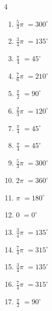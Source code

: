 \begin{multicols}{4}
\begin{enumerate}
  \item $\displaystyle \frac{5}{3}\pi$
        $\displaystyle =300^{\circ}$

  \item $\displaystyle \frac{3}{4}\pi$
        $\displaystyle =135^{\circ}$

  \item $\displaystyle \frac{\pi}{4}$
        $\displaystyle =45^{\circ}$

  \item $\displaystyle \frac{7}{6}\pi$
        $\displaystyle =210^{\circ}$

\columnbreak %

  \item $\displaystyle \frac{\pi}{2}$
        $\displaystyle =90^{\circ}$

  \item $\displaystyle \frac{2}{3}\pi$
        $\displaystyle =120^{\circ}$

  \item $\displaystyle \frac{\pi}{4}$
        $\displaystyle =45^{\circ}$

  \item $\displaystyle \frac{\pi}{4}$
        $\displaystyle =45^{\circ}$

  \item $\displaystyle \frac{5}{3}\pi$
        $\displaystyle =300^{\circ}$

  \item $\displaystyle 2\pi$
        $\displaystyle =360^{\circ}$

  \item $\displaystyle \pi$
        $\displaystyle =180^{\circ}$

  \item $\displaystyle 0$
        $\displaystyle =0^{\circ}$

  \item $\displaystyle \frac{3}{4}\pi$
        $\displaystyle =135^{\circ}$

  \item $\displaystyle \frac{7}{4}\pi$
        $\displaystyle =315^{\circ}$

  \item $\displaystyle \frac{3}{4}\pi$
        $\displaystyle =135^{\circ}$

  \item $\displaystyle \frac{7}{4}\pi$
        $\displaystyle =315^{\circ}$

  \item $\displaystyle \frac{\pi}{2}$
        $\displaystyle =90^{\circ}$


\end{enumerate}
\end{multicols}
